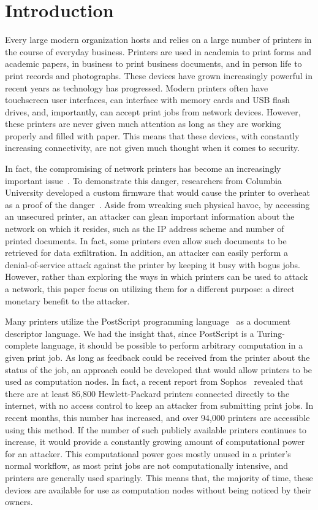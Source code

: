\section{Introduction}

Every large modern organization hosts and relies on a large number of printers in the course of everyday business.
Printers are used in academia to print forms and academic papers, in business to print business documents, and in person life to print records and photographs.
These devices have grown increasingly powerful in recent years as technology has progressed.
Modern printers often have touchscreen user interfaces, can interface with memory cards and USB flash drives, and, importantly, can accept print jobs from network devices.
However, these printers are never given much attention as long as they are working properly and filled with paper.
This means that these devices, with constantly increasing connectivity, are not given much thought when it comes to security.

In fact, the compromising of network printers has become an increasingly important issue~\cite{hacking_network_printers}.
To demonstrate this danger, researchers from Columbia University developed a custom firmware that would cause the printer to overheat as a proof of the danger~\cite{printer_fire}.
Aside from wreaking such physical havoc, by accessing an unsecured printer, an attacker can glean important information about the network on which it resides, such as the IP address scheme and number of printed documents.
In fact, some printers even allow such documents to be retrieved for data exfiltration.
In addition, an attacker can easily perform a denial-of-service attack against the printer by keeping it busy with bogus jobs.
However, rather than exploring the ways in which printers can be used to attack a network, this paper focus on utilizing them for a different purpose: a direct monetary benefit to the attacker.

Many printers utilize the PostScript programming language~\cite{postscript} as a document descriptor language.
We had the insight that, since PostScript is a Turing-complete language, it should be possible to perform arbitrary computation in a given print job.
As long as feedback could be received from the printer about the status of the job, an approach could be developed that would allow printers to be used as computation nodes.
In fact, a recent report from Sophos~\cite{internet_printers} revealed that there are at least 86,800 Hewlett-Packard printers connected directly to the internet, with no access control to keep an attacker from submitting print jobs.
In recent months, this number has increased, and over 94,000 printers are accessible using this method.
If the number of such publicly available printers continues to increase, it would provide a constantly growing amount of computational power for an attacker.
This computational power goes mostly unused in a printer's normal workflow, as most print jobs are not computationally intensive, and printers are generally used sparingly.
This means that, the majority of time, these devices are available for use as computation nodes without being noticed by their owners.

